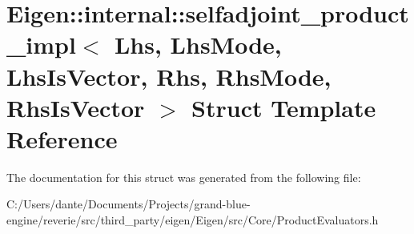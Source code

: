 \hypertarget{struct_eigen_1_1internal_1_1selfadjoint__product__impl}{}\section{Eigen\+::internal\+::selfadjoint\+\_\+product\+\_\+impl$<$ Lhs, Lhs\+Mode, Lhs\+Is\+Vector, Rhs, Rhs\+Mode, Rhs\+Is\+Vector $>$ Struct Template Reference}
\label{struct_eigen_1_1internal_1_1selfadjoint__product__impl}


The documentation for this struct was generated from the following file\+:\begin{DoxyCompactItemize}
\item 
C\+:/\+Users/dante/\+Documents/\+Projects/grand-\/blue-\/engine/reverie/src/third\+\_\+party/eigen/\+Eigen/src/\+Core/Product\+Evaluators.\+h\end{DoxyCompactItemize}
